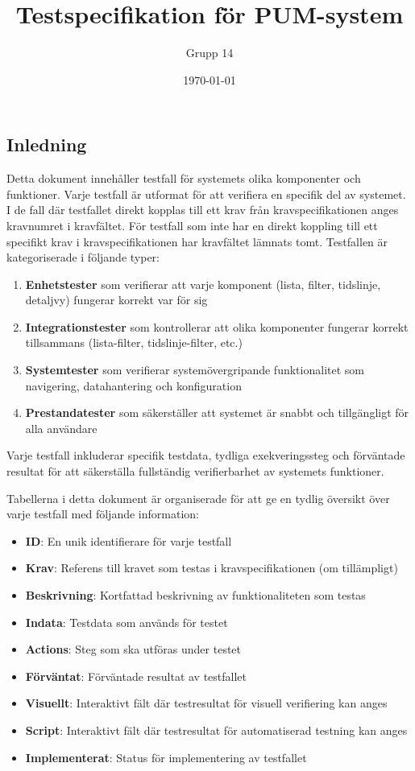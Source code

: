 \documentclass[a3paper,landscape]{article}
\title{Testspecifikation för PUM-system}
\author{Grupp 14}
\date{\today}
\begin{document}
\begin{Form}

\maketitle

\section*{Inledning}
Detta dokument innehåller testfall för systemets olika komponenter och funktioner. Varje testfall är utformat för att verifiera en specifik del av systemet. I de fall där testfallet direkt kopplas till ett krav från kravspecifikationen anges kravnumret i kravfältet. För testfall som inte har en direkt koppling till ett specifikt krav i kravspecifikationen har kravfältet lämnats tomt. Testfallen är kategoriserade i följande typer:

\begin{enumerate}
    \item \textbf{Enhetstester} som verifierar att varje komponent (lista, filter, tidslinje, detaljvy) fungerar korrekt var för sig
    \item \textbf{Integrationstester} som kontrollerar att olika komponenter fungerar korrekt tillsammans (lista-filter, tidslinje-filter, etc.)
    \item \textbf{Systemtester} som verifierar systemövergripande funktionalitet som navigering, datahantering och konfiguration
    \item \textbf{Prestandatester} som säkerställer att systemet är snabbt och tillgängligt för alla användare
\end{enumerate}

Varje testfall inkluderar specifik testdata, tydliga exekveringssteg och förväntade resultat för att säkerställa fullständig verifierbarhet av systemets funktioner.

Tabellerna i detta dokument är organiserade för att ge en tydlig översikt över varje testfall med följande information:
\begin{itemize}
    \item \textbf{ID}: En unik identifierare för varje testfall
    \item \textbf{Krav}: Referens till kravet som testas i kravspecifikationen (om tillämpligt)
    \item \textbf{Beskrivning}: Kortfattad beskrivning av funktionaliteten som testas
    \item \textbf{Indata}: Testdata som används för testet
    \item \textbf{Actions}: Steg som ska utföras under testet
    \item \textbf{Förväntat}: Förväntade resultat av testfallet
    \item \textbf{Visuellt}: Interaktivt fält där testresultat för visuell verifiering kan anges
    \item \textbf{Script}: Interaktivt fält där testresultat för automatiserad testning kan anges
    \item \textbf{Implementerat}: Status för implementering av testfallet
\end{itemize}


\end{Form}
\end{document}

